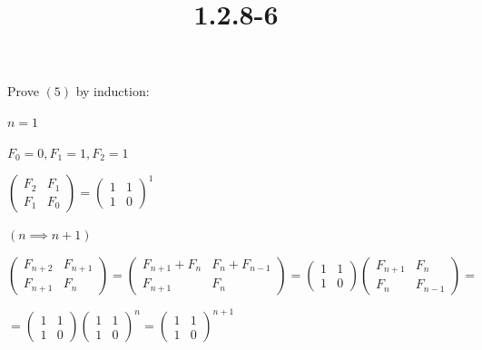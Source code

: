 \documentclass{article}
\title{1.2.8-6}
\begin{document}
\maketitle

Prove $(5)$ by induction:

$n = 1$

$F_0=0, F_1=1, F_2=1$

$\left(\begin{matrix}F_2 & F_1 \\ F_1 & F_0 \end{matrix}\right) = \left(\begin{matrix}1 & 1 \\ 1 & 0 \end{matrix}\right)^1$

$(n \implies n+1)$

$\left(\begin{matrix}F_{n+2} & F_{n+1} \\ F_{n+1} & F_n \end{matrix}\right) = \left(\begin{matrix}F_{n+1} + F_n & F_{n} + F_{n-1} \\ F_{n+1} & F_n \end{matrix}\right) = \left(\begin{matrix}1 & 1 \\ 1 & 0 \end{matrix}\right) \left(\begin{matrix}F_{n+1} & F_{n} \\ F_{n} & F_{n-1} \end{matrix}\right) =$

$= \left(\begin{matrix}1 & 1 \\ 1 & 0 \end{matrix}\right)\left(\begin{matrix}1 & 1 \\ 1 & 0 \end{matrix}\right)^n = \left(\begin{matrix}1 & 1 \\ 1 & 0 \end{matrix}\right)^{n+1}$
\end{document}
